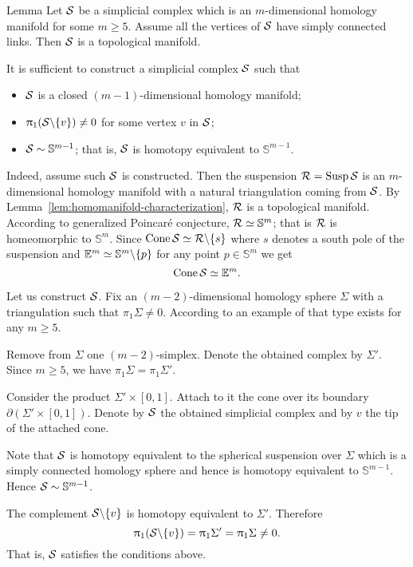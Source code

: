\begin{thm}{Lemma}\label{lem:homomanifold-characterization}
Let $\mathcal{S}$ be a simplicial complex which 
is an $m$-dimensional homology manifold for some $m\ge 5$.
Assume all the vertices of
$\mathcal{S}$ have simply connected links.
Then $\mathcal{S}$ is a topological manifold.
\end{thm}


It is sufficient to construct a simplicial complex $\mathcal{S}$
such that 
\begin{itemize}
\item $\mathcal{S}$ is a closed $(m-1)$-dimensional homology manifold;
\item $\uppi_1(\mathcal{S}\backslash\{v\})\ne0$ for some vertex $v$ in $\mathcal{S}$;
\item $\mathcal{S}\sim \mathbb{S}^{m-1}$; that is, $\mathcal{S}$ is homotopy equivalent to $\mathbb{S}^{m-1}$.
\end{itemize}

Indeed, assume such $\mathcal{S}$ is constructed.
Then the suspension
$\spc{R}\z=\Susp\spc{S}$
is an $m$-dimensional homology manifold with a natural triangulation coming from $\mathcal{S}$.
By Lemma~\ref{lem:homomanifold-characterization},
$\mathcal{R}$ is a topological manifold.
According to generalized Poincar\'{e} conjecture,
$\mathcal{R}\simeq\mathbb{S}^m$;
that is
$\mathcal{R}$ is homeomorphic to $\mathbb{S}^m$.
Since $\mathop{\rm Cone}\nolimits \mathcal{S}\simeq \mathcal{R}\backslash\{s\}$ where $s$ denotes a south pole of the suspension 
and $\mathbb{E}^m\simeq \mathbb{S}^m\backslash\{p\}$
for any point $p\in \mathbb{S}^m$
we get 
\[\mathop{\rm Cone}\nolimits \mathcal{S}\simeq\mathbb{E}^m.\]

Let us construct $\mathcal{S}$.
Fix an $(m-2)$-dimensional homology sphere $\Sigma$ with a triangulation such that $\pi_1\Sigma\ne0$.
According to \cite{kervaire} %
an example of that type exists for any $m\ge 5$.

Remove from $\Sigma$ one $(m-2)$-simplex.
Denote the obtained complex by $\Sigma'$.
Since $m\ge 5$, we have $\pi_1\Sigma=\pi_1\Sigma'$.

Consider the product $\Sigma'\times [0,1]$. 
Attach to it the cone over its boundary $\partial (\Sigma'\times [0,1])$.
Denote by $\mathcal{S}$ the obtained simplicial complex
and by $v$ the tip of the attached cone.

Note that $\mathcal{S}$ is homotopy equivalent to the spherical suspension over $\Sigma$ which is a simply connected homology sphere and hence is homotopy equivalent to $\mathbb{S}^{m-1}$.
  Hence  $\mathcal{S}\sim\mathbb{S}^{m-1}$.

The complement $\mathcal{S}\backslash\{v\}$ is homotopy equivalent to $\Sigma'$.
Therefore 
\[
\uppi_1(\mathcal{S}\backslash\{v\})
=\uppi_1\Sigma'
=\uppi_1\Sigma\ne 0.
\]
That is, $\mathcal{S}$ satisfies the conditions above.
